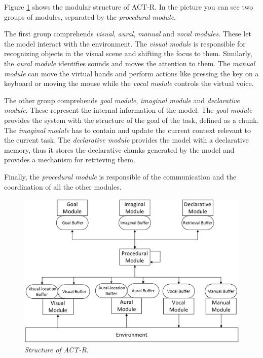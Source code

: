 		Figure \ref{fig:modulesActr} shows the modular structure of ACT-R. In the picture you can see two groups of modules, separated by the \emph{procedural module}. 
	
		The first group comprehends \emph{visual}, \emph{aural}, \emph{manual } and \emph{vocal modules}. These let the model interact with the environment.
		The \emph{visual module} is responsible for recognizing objects in the visual scene and shifting the focus to them. Similarly, the \emph{aural module} identifies sounds and moves the attention to them. 
		The \emph{manual module} can move the virtual hands and perform actions like pressing the key on a keyboard or moving the mouse while the \emph{vocal module} controls the virtual voice.
	
		The other group comprehends \emph{goal module}, \emph{imaginal module} and \emph{declarative module}. These represent the internal information of the model.  
		The \emph{goal module} provides the system with the structure of the goal of the task, defined as a chunk. 
		The \emph{imaginal module} has to contain and update the current context relevant to the current task. 
		The \emph{declarative module} provides the model with a declarative memory, thus it stores the declarative chunks generated by the model and provides a mechanism for retrieving them. 
	
		Finally, the \emph{procedural module} is responsible of the communication and the coordination of all the other modules. 
	
		\begin{figure}[h]
		  \begin{center} 
		    \includegraphics[scale=0.25]{images/ch_01/actr.eps}
		  \end{center} 
		  \caption{\textit{Structure of ACT-R.}}  
		  \label{fig:modulesActr}
		\end{figure}
	
